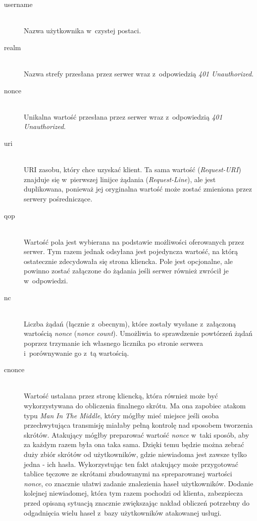 \documentclass[11pt]{aghdpl}
\begin{document}
\begin{description}
\item[username] \hfill \\
Nazwa użytkownika w~czystej postaci.
\item[realm] \hfill \\
Nazwa strefy przesłana przez serwer wraz z~odpowiedzią \emph{401 Unauthorized}.
\item[nonce] \hfill \\
Unikalna wartość przesłana przez serwer wraz z~odpowiedzią \emph{401 Unauthorized}.
\item[uri] \hfill \\
URI zasobu, który chce uzyskać klient. Ta sama wartość (\emph{Request-URI}) znajduje się w~pierwszej linijce żądania (\emph{Request-Line}), ale jest duplikowana, ponieważ jej oryginalna wartość może zostać zmieniona przez serwery pośredniczące.
\item[qop] \hfill \\
Wartość pola jest wybierana na podstawie możliwości oferowanych przez serwer. Tym razem jednak odsyłana jest pojedyncza wartość, na którą ostatecznie zdecydowała się strona kliencka. Pole jest opcjonalne, ale powinno zostać załączone do żądania jeśli serwer również zwrócił je w~odpowiedzi.
\item[nc] \hfill \\
Liczba żądań (łącznie z~obecnym), które zostały wysłane z~załączoną wartością \emph{nonce} (\emph{nonce count}). Umożliwia to sprawdzenie powtórzeń żądań poprzez trzymanie ich własnego licznika po stronie serwera i~porównywanie go z~tą wartością.
\item[cnonce] \hfill \\
Wartość ustalana przez stronę kliencką, która również może być wykorzystywana do obliczenia finalnego skrótu. Ma ona zapobiec atakom typu \emph{Man In The Middle}, który mógłby mieć miejsce jeśli osoba przechwytująca transmisję miałaby pełną kontrolę nad sposobem tworzenia skrótów. Atakujący mógłby preparować wartość \emph{nonce} w~taki sposób, aby za każdym razem była ona taka sama. Dzięki temu będzie można zebrać duży zbiór skrótów od użytkowników, gdzie niewiadoma jest zawsze tylko jedna - ich hasła. Wykorzystując ten fakt atakujący może przygotować tablice tęczowe ze skrótami zbudowanymi na spreparowanej wartości \emph{nonce}, co znacznie ułatwi zadanie znalezienia haseł użytkowników. Dodanie kolejnej niewiadomej, która tym razem pochodzi od klienta, zabezpiecza przed opisaną sytuacją znacznie zwiększając nakład obliczeń potrzebny do odgadnięcia wielu haseł z~bazy użytkowników atakowanej usługi.

\end{description}
\end{document}
